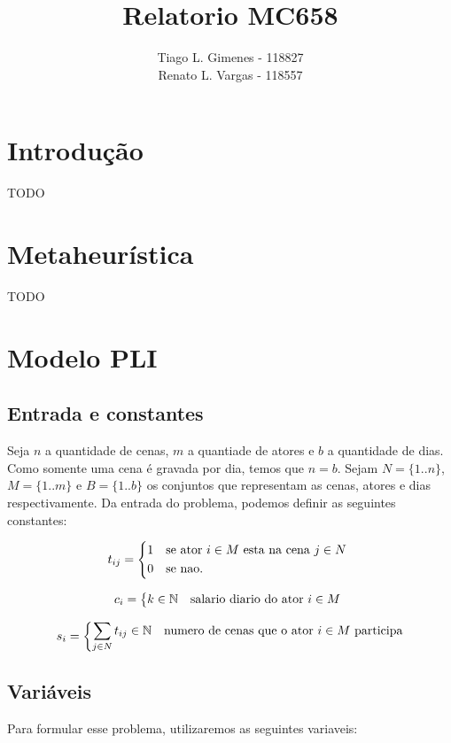 \documentclass[a4paper,11pt,twoside]{article}
\title{Relatorio MC658}
\author{Tiago L. Gimenes - 118827\\
        Renato L. Vargas - 118557}
\begin{document}
\maketitle

\section{Introdução}
TODO

\section{Metaheurística}
TODO

\section{Modelo PLI}
\subsection{Entrada e constantes}
Seja $n$ a quantidade de cenas, $m$ a quantiade de atores e $b$ a quantidade de
dias. Como somente uma cena é gravada por dia, temos que $n = b$. Sejam $N=\{1..n\}$,
$M = \{1..m\}$ e $B=\{1..b\}$ os conjuntos que representam as cenas, atores e dias
respectivamente. Da entrada do problema, podemos definir as seguintes constantes:

\begin{equation}
  t_{ij} = \begin{dcases*}
              1 & se ator $i \in M$ esta na cena $j \in N$ \\
              0 & se nao.
           \end{dcases*}
\end{equation}

\begin{equation}
  c_{i} = \begin{dcases*} k \in \mathbb{N} & salario diario do ator $i \in M$ \end{dcases*}
\end{equation}

\begin{equation}
  s_{i} = \begin{dcases*} \sum_{j \in N} t_{ij} \in \mathbb{N} & numero de cenas que o ator $i \in M$ participa\end{dcases*}
\end{equation}

\subsection{Variáveis}
Para formular esse problema, utilizaremos as seguintes variaveis:
\end{document}
